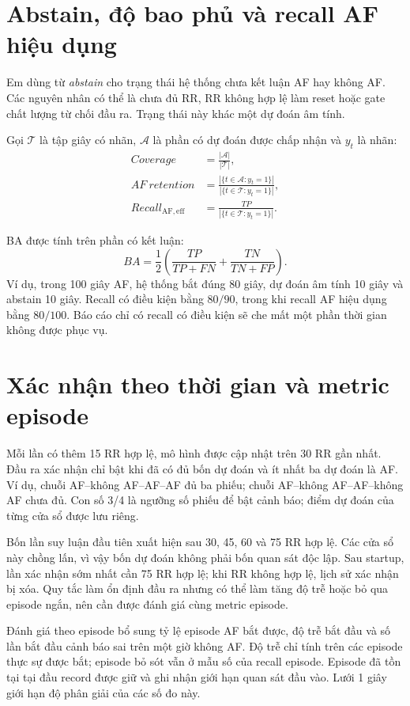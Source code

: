 \documentclass[12pt,a4paper,oneside]{report}
\begin{document}
\section{Abstain, độ bao phủ và recall AF hiệu dụng}
Em dùng từ \emph{abstain} cho trạng thái hệ thống chưa kết luận AF hay không AF. Các nguyên nhân có thể là chưa đủ RR, RR không hợp lệ làm reset hoặc gate chất lượng từ chối đầu ra. Trạng thái này khác một dự đoán âm tính.

\begin{samepage}
Gọi $\mathcal{T}$ là tập giây có nhãn, $\mathcal{A}$ là phần có dự đoán được chấp nhận và $y_t$ là nhãn:
\begin{align}
Coverage&=\frac{|\mathcal{A}|}{|\mathcal{T}|},\\
AF\ retention&=\frac{|\{t\in\mathcal{A}:y_t=1\}|}{|\{t\in\mathcal{T}:y_t=1\}|},\\
Recall_{\mathrm{AF,eff}}&=\frac{TP}{|\{t\in\mathcal{T}:y_t=1\}|}.
\end{align}
\end{samepage}
BA được tính trên phần có kết luận:
\begin{equation}
BA=\frac{1}{2}\left(\frac{TP}{TP+FN}+\frac{TN}{TN+FP}\right).
\end{equation}
Ví dụ, trong 100 giây AF, hệ thống bắt đúng 80 giây, dự đoán âm tính 10 giây và abstain 10 giây. Recall có điều kiện bằng $80/90$, trong khi recall AF hiệu dụng bằng $80/100$. Báo cáo chỉ có recall có điều kiện sẽ che mất một phần thời gian không được phục vụ.

\section{Xác nhận theo thời gian và metric episode}
Mỗi lần có thêm 15 RR hợp lệ, mô hình được cập nhật trên 30 RR gần nhất. Đầu ra xác nhận chỉ bật khi đã có đủ bốn dự đoán và ít nhất ba dự đoán là AF. Ví dụ, chuỗi AF--không AF--AF--AF đủ ba phiếu; chuỗi AF--không AF--AF--không AF chưa đủ. Con số 3/4 là ngưỡng số phiếu để bật cảnh báo; điểm dự đoán của từng cửa sổ được lưu riêng.

Bốn lần suy luận đầu tiên xuất hiện sau 30, 45, 60 và 75 RR hợp lệ. Các cửa sổ này chồng lấn, vì vậy bốn dự đoán không phải bốn quan sát độc lập. Sau startup, lần xác nhận sớm nhất cần 75 RR hợp lệ; khi RR không hợp lệ, lịch sử xác nhận bị xóa. Quy tắc làm ổn định đầu ra nhưng có thể làm tăng độ trễ hoặc bỏ qua episode ngắn, nên cần được đánh giá cùng metric episode.

Đánh giá theo episode bổ sung tỷ lệ episode AF bắt được, độ trễ bắt đầu và số lần bắt đầu cảnh báo sai trên một giờ không AF. Độ trễ chỉ tính trên các episode thực sự được bắt; episode bỏ sót vẫn ở mẫu số của recall episode. Episode đã tồn tại tại đầu record được giữ và ghi nhận giới hạn quan sát đầu vào. Lưới 1 giây giới hạn độ phân giải của các số đo này.
\end{document}
